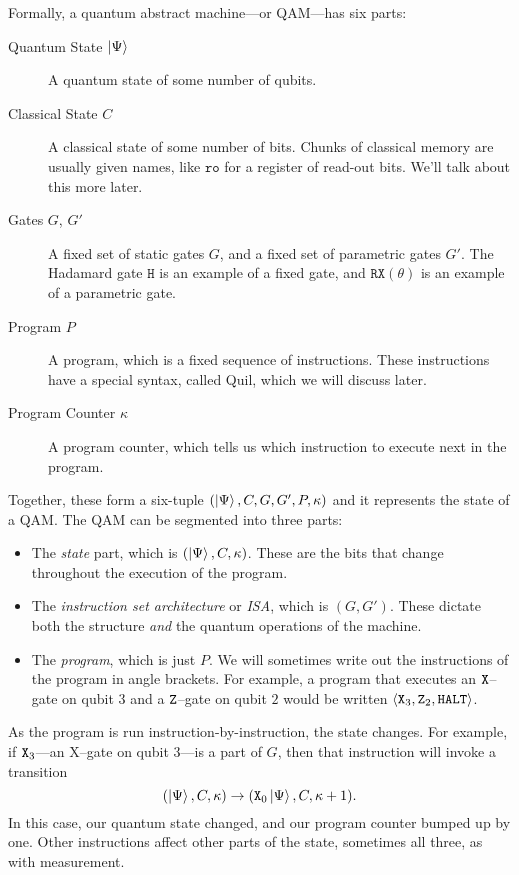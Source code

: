 Formally, a quantum abstract machine---or QAM---has six parts:
\begin{description}
\item[Quantum State $\ket{\Psi}$] A quantum state of some number of qubits.
\item[Classical State $C$] A classical state of some number of bits. Chunks of classical memory are usually given names, like $\mathtt{ro}$ for a register of read-out bits. We'll talk about this more later.
\item[Gates $G$, $G'$] A fixed set of static gates $G$, and a fixed set of parametric gates $G'$. The Hadamard gate $\texttt{H}$ is an example of a fixed gate, and $\mathtt{RX}(\theta)$ is an example of a parametric gate.
\item[Program $P$] A program, which is a fixed sequence of instructions. These instructions have a special syntax, called Quil, which we will discuss later.
\item[Program Counter $\kappa$] A program counter, which tells us which instruction to execute next in the program.
\end{description}

Together, these form a six-tuple $(\ket{\Psi}, C, G, G', P, \kappa)$ and it represents the state of a QAM. The QAM can be segmented into three parts:
\begin{itemize}
\item The \emph{state} part, which is $(\ket{\Psi}, C, \kappa)$. These are the bits that change throughout the execution of the program.
\item The \emph{instruction set architecture} or \emph{ISA}, which is $(G, G')$. These dictate both the structure \emph{and} the quantum operations of the machine.
\item The \emph{program}, which is just $P$. We will sometimes write out the instructions of the program in angle brackets. For example, a program that executes an $\mathtt{X}$--gate on qubit $3$ and a $\mathtt{Z}$--gate on qubit $2$ would be written $\langle\mathtt{X}_3,\mathtt{Z}_2,\mathtt{HALT}{}\rangle$.
\end{itemize}
As the program is run instruction-by-instruction, the state changes. For example, if $\mathtt{X}_3$---an X--gate on qubit $3$---is a part of $G$, then that instruction will invoke a transition
\begin{displaymath}
(\ket{\Psi}, C, \kappa) \to (\mathtt{X}_0\ket{\Psi}, C, \kappa+1).
\end{displaymath}
In this case, our quantum state changed, and our program counter bumped up by one. Other instructions affect other parts of the state, sometimes all three, as with measurement.

